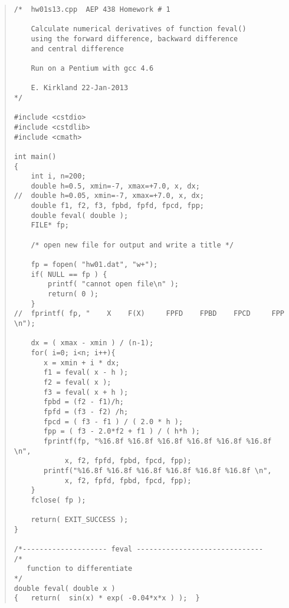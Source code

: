 \documentclass[11pt,letterpaper]{article}
\begin{document}
\begin{quote} \footnotesize
\begin{verbatim}
/*  hw01s13.cpp  AEP 438 Homework # 1

    Calculate numerical derivatives of function feval()
    using the forward difference, backward difference
    and central difference  

	Run on a Pentium with gcc 4.6

	E. Kirkland 22-Jan-2013	
*/

#include <cstdio>
#include <cstdlib>
#include <cmath>

int main()
{
    int i, n=200;
    double h=0.5, xmin=-7, xmax=+7.0, x, dx;
//  double h=0.05, xmin=-7, xmax=+7.0, x, dx;
    double f1, f2, f3, fpbd, fpfd, fpcd, fpp;
    double feval( double );
    FILE* fp;

    /* open new file for output and write a title */

    fp = fopen( "hw01.dat", "w+");
    if( NULL == fp ) {
        printf( "cannot open file\n" );
        return( 0 );
    }
//  fprintf( fp, "    X    F(X)     FPFD    FPBD    FPCD     FPP \n");

    dx = ( xmax - xmin ) / (n-1);
    for( i=0; i<n; i++){
       x = xmin + i * dx;
       f1 = feval( x - h );
       f2 = feval( x );
       f3 = feval( x + h );
       fpbd = (f2 - f1)/h;
       fpfd = (f3 - f2) /h;
       fpcd = ( f3 - f1 ) / ( 2.0 * h );
       fpp = ( f3 - 2.0*f2 + f1 ) / ( h*h );
       fprintf(fp, "%16.8f %16.8f %16.8f %16.8f %16.8f %16.8f \n",
            x, f2, fpfd, fpbd, fpcd, fpp);
       printf("%16.8f %16.8f %16.8f %16.8f %16.8f %16.8f \n",
            x, f2, fpfd, fpbd, fpcd, fpp);
    }   
    fclose( fp );

    return( EXIT_SUCCESS );
}

/*-------------------- feval ------------------------------
/*
   function to differentiate
*/
double feval( double x )
{   return(  sin(x) * exp( -0.04*x*x ) );  }
\end{verbatim}
\end{quote}
\end{document}
